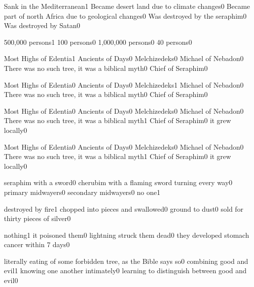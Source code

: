 {Sank in the Mediterranean}{1}
{Became desert land due to climate changes}{0}
{Became part of north Africa due to geological changes}{0}
{Was destroyed by the seraphim}{0}
{Was destroyed by Satan}{0}
\qstop

{500,000 persons}{1}
{100 persons}{0}
{1,000,000 persons}{0}
{40 persons}{0}
\qstop

{Most Highs of Edentia}{1}
{Ancients of Days}{0}
{Melchizedeks}{0}
{Michael of Nebadon}{0}
{There was no such tree, it was a biblical myth}{0}
{Chief of Seraphim}{0}
\qstop

{Most Highs of Edentia}{0}
{Ancients of Days}{0}
{Melchizedeks}{1}
{Michael of Nebadon}{0}
{There was no such tree, it was a biblical myth}{0}
{Chief of Seraphim}{0}
\qstop

{Most Highs of Edentia}{0}
{Ancients of Days}{0}
{Melchizedeks}{0}
{Michael of Nebadon}{0}
{There was no such tree, it was a biblical myth}{1}
{Chief of Seraphim}{0}
{it grew locally}{0}
\qstop

{Most Highs of Edentia}{0}
{Ancients of Days}{0}
{Melchizedeks}{0}
{Michael of Nebadon}{0}
{There was no such tree, it was a biblical myth}{1}
{Chief of Seraphim}{0}
{it grew locally}{0}
\qstop


{seraphim with a sword}{0}
{cherubim with a flaming sword turning every way}{0}
{primary midwayers}{0}
{secondary midwayers}{0}
{no one}{1}
\qstop

{destroyed by fire}{1}
{chopped into pieces and swallowed}{0}
{ground to dust}{0}
{sold for thirty pieces of silver}{0}
\qstop

{nothing}{1}
{it poisoned them}{0}
{lightning struck them dead}{0}
{they developed stomach cancer within 7 days}{0}
\qstop

{literally eating of some forbidden tree, as the Bible says so}{0}
{combining good and evil}{1}
{knowing one another intimately}{0}
{learning to distinguish between good and evil}{0}
\qstop

